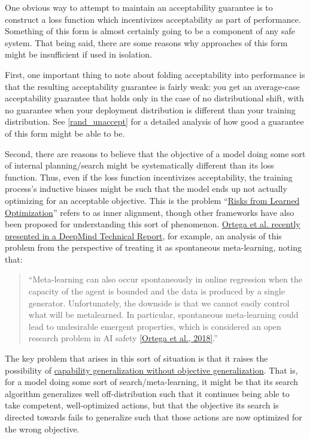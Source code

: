 \documentclass{amsart}
\begin{document}
One obvious way to attempt to maintain an acceptability guarantee is to construct a loss function which incentivizes acceptability as part of performance. Something of this form is almost certainly going to be a component of any safe system. That being said, there are some reasons why approaches of this form might be insufficient if used in isolation.

First, one important thing to note about folding acceptability into performance is that the resulting acceptability guarantee is fairly weak: you get an average-case acceptability guarantee that holds only in the case of no distributional shift, with no guarantee when your deployment distribution is different than your training distribution. See \autoref{rand_unaccept} for a detailed analysis of how good a guarantee of this form might be able to be.

Second, there are reasons to believe that the objective of a model doing some sort of internal planning/search might be systematically different than its loss function. Thus, even if the loss function incentivizes acceptability, the training process's inductive biases might be such that the model ends up not actually optimizing for an acceptable objective. This is the problem ``\href{https://arxiv.org/abs/1906.01820}{Risks from Learned Optimization}'' refers to as inner alignment, though other frameworks have also been proposed for understanding this sort of phenomenon. \href{https://arxiv.org/abs/1905.03030}{Ortega et al. recently presented in a DeepMind Technical Report}, for example, an analysis of this problem from the perspective of treating it as spontaneous meta-learning, noting that:
\begin{quote}
    ``Meta-learning can also occur spontaneously in online regression when the capacity of the agent is bounded and the data is produced by a single generator. Unfortunately, the downside is that we cannot easily control what will be metalearned. In particular, spontaneous meta-learning could lead to undesirable emergent properties, which is considered an open research problem in AI safety \href{https://medium.com/@deepmindsafetyresearch/building-safe-artificial-intelligence-52f5f75058f1}{[Ortega et al., 2018]}.''
\end{quote}
The key problem that arises in this sort of situation is that it raises the possibility of \href{https://www.alignmentforum.org/posts/2mhFMgtAjFJesaSYR/2-d-robustness}{capability generalization without objective generalization}. That is, for a model doing some sort of search/meta-learning, it might be that its search algorithm generalizes well off-distribution such that it continues being able to take competent, well-optimized actions, but that the objective its search is directed towards fails to generalize such that those actions are now optimized for the wrong objective.
\end{document}
